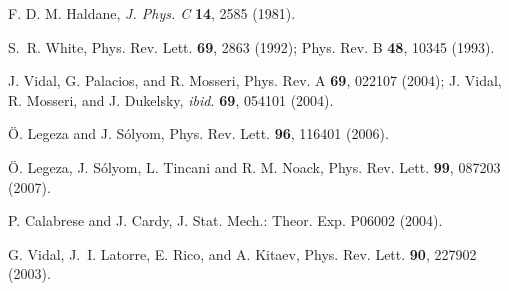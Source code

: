 \documentclass[aps,prb,twocolumn,floatfix,showpacs]{revtex4}
\begin{document}
\begin{thebibliography}{}
 F. D. M. Haldane, {\em J. Phys. C} {\bf 14}, 2585 (1981). 

 S.~R. White, Phys. Rev. Lett. {\bf 69}, 2863 (1992);
Phys. Rev. B {\bf 48}, 10345 (1993).

J. Vidal, G. Palacios, and R. Mosseri, Phys. Rev. A {\bf 69}, 022107 (2004);
J. Vidal, R. Mosseri, and J. Dukelsky, {\sl ibid.} {\bf 69}, 054101 (2004).

 {\"O}. Legeza and J. S\'olyom,
     Phys. Rev. Lett. {\bf 96}, 116401  (2006).

 {\"O}. Legeza, J. S\'olyom, L. Tincani and
R. M. Noack, Phys. Rev. Lett. {\bf 99}, 087203 (2007).

 P. Calabrese and J. Cardy, J. Stat. Mech.: Theor. Exp. P06002
(2004).


 G. Vidal, J.~I. Latorre, E. Rico, and A. Kitaev,
    Phys. Rev. Lett. {\bf 90},  227902  (2003).



\end{thebibliography}
\end{document}
